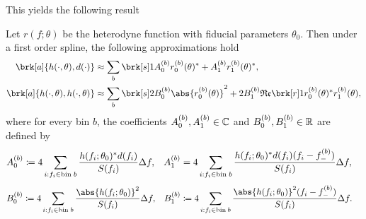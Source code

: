 This yields the following result
%
\begin{proposition}[]\label{}
Let $r(f;\theta)$ be the heterodyne function with fiducial parameters $\theta_0$.
Then under a first order spline, the following approximations hold
\begin{align*}
\brk[a]{h(\cdot, \theta), d(\cdot)} &\approx \sum_b \brk[s]1{A_0^{(b)} r_0^{(b)}(\theta)^* + A_1^{(b)} r_1^{(b)}(\theta)^*}, \\
\brk[a]{h(\cdot,\theta), h(\cdot,\theta)} &\approx \sum_b \brk[s]2{B_0^{(b)} \abs{r_0^{(b)}(\theta)}^2 + 2 B_1^{(b)} \re \brk[r]1{r_0^{(b)}(\theta)^* r_1^{(b)}(\theta)}},
\end{align*}
where for every bin $b$, the coefficients $A_0^{(b)}, A_1^{(b)} \in \mathbb{C}$ and $B_0^{(b)}, B_1^{(b)} \in \mathbb{R}$ are defined by
\begin{align*}
A_0^{(b)} &\coloneqq 4 \sum_{i: f_i \in \text{bin} \; b} \frac{ h(f_i;\theta_0)^* d(f_i) }{S(f_i)} \Delta f, & A_1^{(b)} &= 4 \sum_{i:f_i \in \text{bin} \; b} \frac{ h(f_i;\theta_0)^*d(f_i) (f_i - f_-^{(b)})}{S(f_i)} \Delta f,
\end{align*}
%
\begin{align*}
B_0^{(b)} &\defn 4 \sum_{i:f_i \in \text{bin} \; b} \frac{\abs{h(f_i;\theta_0)}^2}{S(f_i)}\Delta f, & B_1^{(b)} &\defn 4 \sum_{i:f_i \in \text{bin} \: b} \frac{\abs{h(f_i;\theta_0)}^2(f_i-f_-^{(b)})}{S(f_i)}\Delta f.
\end{align*}
\end{proposition}
